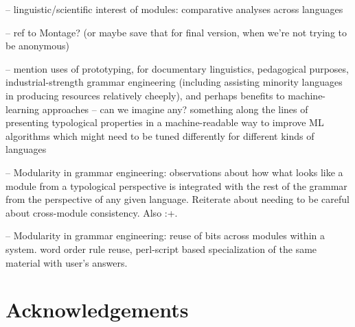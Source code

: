 \documentclass[11pt]{article}
\begin{document}
-- linguistic/scientific interest of modules: comparative analyses
across languages

-- ref to Montage? (or maybe save that for final version, when 
we're not trying to be anonymous)

-- mention uses of prototyping, for documentary linguistics, pedagogical
purposes, industrial-strength grammar engineering (including assisting
minority languages in producing resources relatively cheeply), and perhaps
benefits to machine-learning approaches -- can we imagine any?  something
along the lines of presenting typological properties in a machine-readable
way to improve ML algorithms which might need to be tuned differently for
different kinds of languages

-- Modularity in grammar engineering: observations about how what looks
like a module from a typological perspective is integrated with the rest
of the grammar from the perspective of any given language. Reiterate about
needing to be careful about cross-module consistency. Also :+.

-- Modularity in grammar engineering: reuse of bits across modules within
a system.  word order rule reuse, perl-script based specialization of the
same material with user's answers.


\section*{Acknowledgements}



%

\end{document}
